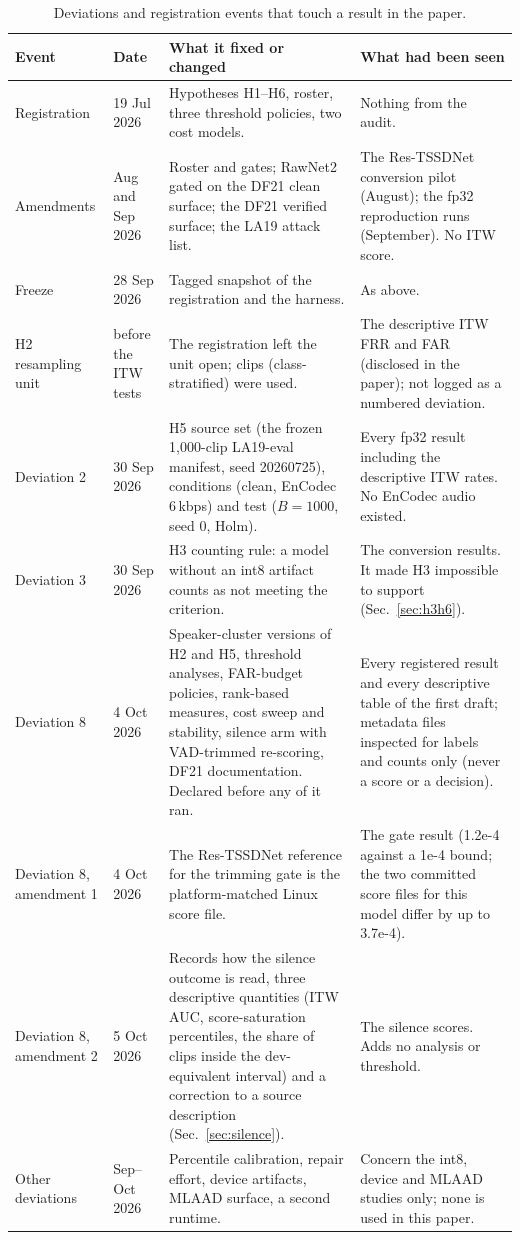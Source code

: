\documentclass[10pt]{article}
\begin{document}
\begin{table}[!ht]
\caption{Deviations and registration events that touch a result in the paper.}
\label{tab:dev}
\centering
\footnotesize
\setlength{\tabcolsep}{3pt}
\begin{tabular}{@{}p{}p{}p{}p{}@{}}
\toprule
Event & Date & What it fixed or changed & What had been seen \\
\midrule
Registration & 19 Jul 2026 & Hypotheses H1--H6, roster, three threshold policies, two cost models. & Nothing from the audit. \\
Amendments & Aug and Sep 2026 & Roster and gates; RawNet2 gated on the DF21 clean surface; the DF21 verified surface; the LA19 attack list. &
The Res-TSSDNet conversion pilot (August); the fp32 reproduction runs (September). No ITW score. \\
Freeze & 28 Sep 2026 & Tagged snapshot of the registration and the harness. & As above. \\
H2 resampling unit & before the ITW tests & The registration left the unit open; clips (class-stratified) were used. & The descriptive ITW FRR and FAR (disclosed in the
paper); not logged as a numbered deviation. \\
Deviation 2 & 30 Sep 2026 & H5 source set (the frozen 1,000-clip LA19-eval manifest, seed 20260725), conditions (clean, EnCodec 6\,kbps) and test
(\(B=1000\), seed 0, Holm). & Every fp32 result including the descriptive ITW rates. No EnCodec audio existed. \\
Deviation 3 & 30 Sep 2026 & H3 counting rule: a model without an int8 artifact counts as not meeting the criterion. & The conversion results. It
made H3 impossible to support (Sec.~\ref{sec:h3h6}). \\
Deviation 8 & 4 Oct 2026 & Speaker-cluster versions of H2 and H5, threshold analyses, FAR-budget policies, rank-based measures, cost sweep and
stability, silence arm with VAD-trimmed re-scoring, DF21 documentation. Declared before any of it ran. & Every registered result and every descriptive
table of the first draft; metadata files inspected for labels and counts only (never a score or a decision). \\
Deviation 8, amendment 1 & 4 Oct 2026 & The Res-TSSDNet reference for the trimming gate is the platform-matched Linux score file. & The gate
result (1.2e-4 against a 1e-4 bound; the two committed score files for this model differ by up to 3.7e-4). \\
Deviation 8, amendment 2 & 5 Oct 2026 & Records how the silence outcome is read, three descriptive quantities (ITW AUC, score-saturation percentiles, the share of
clips inside the dev-equivalent interval) and a correction to a source description (Sec.~\ref{sec:silence}). & The silence scores. Adds no analysis or threshold. \\
Other deviations & Sep--Oct 2026 & Percentile calibration, repair effort, device artifacts, MLAAD surface, a second runtime. & Concern the int8, device and
MLAAD studies only; none is used in this paper. \\
\bottomrule
\end{tabular}
\end{table}
\end{document}
